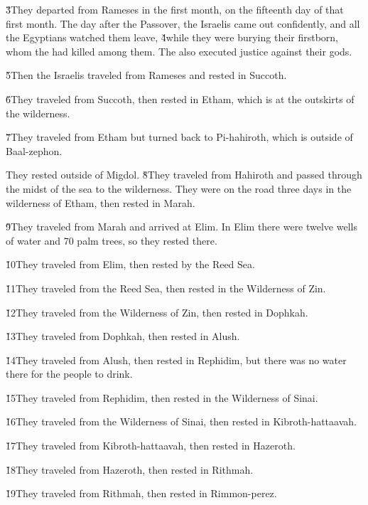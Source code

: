 \v{3}They departed from Rameses in the first month, on the fifteenth day of that first month. The day after the Passover, the Israelis came out confidently, and all the Egyptians watched them leave, \v{4}while they were burying their firstborn, whom the  had killed among them. The  also executed justice against their gods.

\v{5}Then the Israelis traveled from Rameses and rested in Succoth.

\v{6}They traveled from Succoth, then rested in Etham, which is at the outskirts of the wilderness.

\v{7}They traveled from Etham but turned back to Pi-hahiroth, which is outside of Baal-zephon.

They rested outside of Migdol. \v{8}They traveled from Hahiroth and passed through the midst of the sea to the wilderness. They were on the road three days in the wilderness of Etham, then rested in Marah.

\v{9}They traveled from Marah and arrived at Elim. In Elim there were twelve wells of water and 70 palm trees, so they rested there.

\v{10}They traveled from Elim, then rested by the Reed Sea.

\v{11}They traveled from the Reed Sea, then rested in the Wilderness of Zin.

\v{12}They traveled from the Wilderness of Zin, then rested in Dophkah.

\v{13}They traveled from Dophkah, then rested in Alush.

\v{14}They traveled from Alush, then rested in Rephidim, but there was no water there for the people to drink.

\v{15}They traveled from Rephidim, then rested in the Wilderness of Sinai.

\v{16}They traveled from the Wilderness of Sinai, then rested in Kibroth-hattaavah.

\v{17}They traveled from Kibroth-hattaavah, then rested in Hazeroth.

\v{18}They traveled from Hazeroth, then rested in Rithmah.

\v{19}They traveled from Rithmah, then rested in Rimmon-perez.

